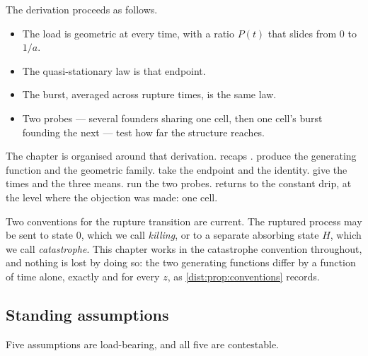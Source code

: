 \begin{samepage}
The derivation proceeds as follows.
\begin{itemize}[leftmargin=1.6em,itemsep=0.25em,topsep=0.35em]
\item The load is geometric at every time, with a ratio $P(t)$ that slides
from $0$ to $1/a$.
\item The quasi-stationary law is that endpoint.
\item The burst, averaged across rupture times, is the same law.
\item Two probes --- several founders sharing one cell, then one cell's burst
founding the next --- test how far the structure reaches.
\end{itemize}
\end{samepage}

The chapter is organised around that derivation.  recaps
\ChCore.  produce the generating function
and the geometric family.  take the
endpoint and the identity.  give
the times and the three means.  run the
two probes.  returns to the constant drip, at the level
where the objection was made: one cell.

Two conventions for the rupture transition are current. The ruptured process
may be sent to state $0$, which we call \emph{killing}, or to a separate
absorbing state $H$, which we call \emph{catastrophe}. This chapter works in
the catastrophe convention throughout, and nothing is lost by doing so: the
two generating functions differ by a function of time alone, exactly and for
every $z$, as \cref{dist:prop:conventions} records.

\subsection{Standing assumptions}
\label{dist:sec:assumptions}

Five assumptions are load-bearing, and all five are contestable.

